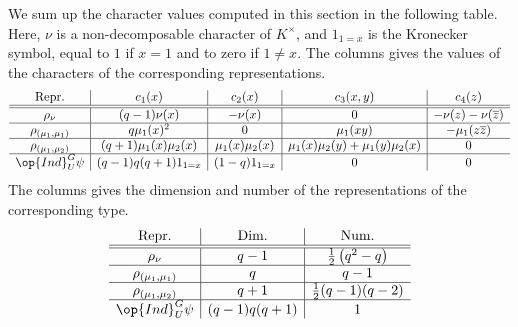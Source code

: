 \documentclass[../main.tex]{subfiles}
\begin{document}
We sum up the character values computed in this section in the following table. Here, $\nu$ is a non-decomposable character of $K^\times$, and $1_{1=x}$ is the Kronecker symbol, equal to $1$ if $x=1$ and to zero if $1\ne x$. The columns gives the values of the characters of the corresponding representations.
\[\begin{array}{c|c|c|c|c}
	\text{Repr.} & c_1(x) & c_2(x) & c_3(x,y) & c_4(z) \\\hline\hline
	\rho_\nu & (q-1)\nu(x) & -\nu(x) & 0 & -\nu(z)-\nu(\overline z) \\\hline
	\rho_{(\mu_1,\mu_1)} & q\mu_1(x)^2 & 0 & \mu_1(xy) & -\mu_1(z\overline z) \\\hline
	\rho_{(\mu_1,\mu_2)} & (q+1)\mu_1(x)\mu_2(x) & \mu_1(x)\mu_2(x) & \mu_1(x)\mu_2(y)+\mu_1(y)\mu_2(x) & 0 \\\hline
	\op{Ind}^G_U\psi & (q-1)q(q+1)1_{1=x} & (1-q)1_{1=x} & 0 & 0
\end{array}\]
The columns gives the dimension and number of the representations of the corresponding type.
\[\begin{array}{c|c|c}
	\text{Repr.} & \text{Dim.} & \text{Num.} \\\hline\hline
	\rho_\nu & q-1 & \frac12\left(q^2-q\right) \\\hline
	\rho_{(\mu_1,\mu_1)} & q & q-1 \\\hline
	\rho_{(\mu_1,\mu_2)} & q+1 & \frac12(q-1)(q-2) \\\hline
	\op{Ind}^G_U\psi & (q-1)q(q+1) & 1 
\end{array}\]
\end{document}
